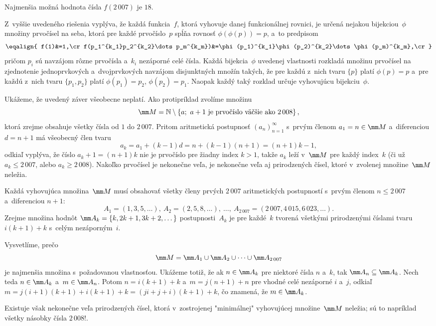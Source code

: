 {Najmenšia možná hodnota čísla $f(2\,007)$ je $18$.

\poznamka
Z~vyššie uvedeného riešenia vyplýva, že každá funkcia~$f$, ktorá
vyhovuje danej funkcionálnej rovnici, je určená nejakou
bijekciou~$\phi$ množiny prvočísel na seba, ktorá pre každé
prvočíslo~$p$ spĺňa rovnosť $\phi\left(\phi(p)\right)=p$, a~to
predpisom
$$
\eqalign{
f(1)&=1,\cr
f(p_1^{k_1}p_2^{k_2}\dots p_m^{k_m})&=\phi(p_1)^{k_1}\phi(p_2)^{k_2}\dots \phi(p_m)^{k_m},\cr
}
$$
pričom $p_i$ sú navzájom rôzne prvočísla a~$k_i$ nezáporné celé
čísla. Každá bijekcia~$\phi$ uvedenej vlastnosti rozkladá množinu
prvočísel na zjednotenie jednoprvkových a~dvojprvkových navzájom
disjunktných množín takých, že pre každú z~nich tvaru $\{p\}$
platí $\phi(p)=p$ a~pre každú z~nich tvaru $\{p_1,p_2\}$ platí
$\phi(p_1)=p_2$, $\phi(p_2)=p_1$. Naopak každý taký rozklad
určuje vyhovujúcu bijekciu~$\phi$.
}

{%
Ukážeme, že uvedený záver všeobecne
neplatí. Ako protipríklad zvolíme množinu
$$
\mm M=\Bbb N\setminus\left\{a;\ a+1\text{ je prvočíslo väčšie ako
2\,008}\right\},
$$
ktorá zrejme obsahuje všetky čísla od $1$ do $2\,007$.
Pritom aritmetická postupnosť
$(a_n)_{n=1}^{\infty}$ s~prvým členom $a_1=n\in\mm M$ 
a~diferenciou $d=n+1$ má všeobecný člen tvaru
$$
a_k=a_1+(k-1)d=n+(k-1)(n+1)=(n+1)k-1,
$$
odkiaľ vyplýva, že číslo $a_k+1=(n+1)k$ nie je prvočíslo
pre žiadny index $k>1$,
takže $a_k$ leží v~$\mm M$ pre každý index~$k$ (či už $a_k\le2\,007$,
alebo $a_k\ge 2\,008$). Nakoľko prvočísel je nekonečne veľa,
je nekonečne veľa aj prirodzených čísel, ktoré v~zvolenej množine~$\mm M$ neležia.

\ineriesenie
Každá vyhovujúca množina~$\mm M$ musí obsahovať
všetky členy prvých $2\,007$ aritmetických postupností
s~prvým členom $n\le2\,007$ a~diferenciou $n+1$:
$$
A_1=(1,3,5,\dots),\ A_2=(2,5,8,\dots),\ \dots,\
A_{2\,007}=(2\,007,4\,015,6\,023,\dots).
$$
Zrejme množina hodnôt $\mm A_k=\{k,2k+1,3k+2,\dots\}$
postupnosti~$A_k$ je pre každé~$k$
tvorená všetkými prirodzenými číslami tvaru $i(k+1)+k$ s~celým
nezáporným~$i$.

Vysvetlíme, prečo
$$
\mm M=\mm A_1\cup \mm A_2\cup\dots\cup \mm A_{2\,007}
$$
je najmenšia množina s~požadovanou vlastnosťou. Ukážeme totiž, že
ak $n\in \mm A_k$ pre niektoré čísla $n$ a~$k$, tak $\mm
A_n\subseteq \mm A_k$. Nech teda $n\in\mm A_k$ a~$m\in \mm A_n$.
Potom $n=i(k+1)+k$ a~$m=j(n+1)+n$ pre vhodné celé nezáporné
$i$ a~$j$, odkiaľ $m=j(i+1)(k+1)+i(k+1)+k=(ji+j+i)(k+1)+k$, čo
znamená, že $m\in\mm A_k$.

Existuje však nekonečne veľa prirodzených čísel, ktorá v~zostrojenej
"minimálnej" vyhovujúcej množine~$\mm M$ neležia; sú to napríklad
všetky násobky čísla $2\,008!$.
}

